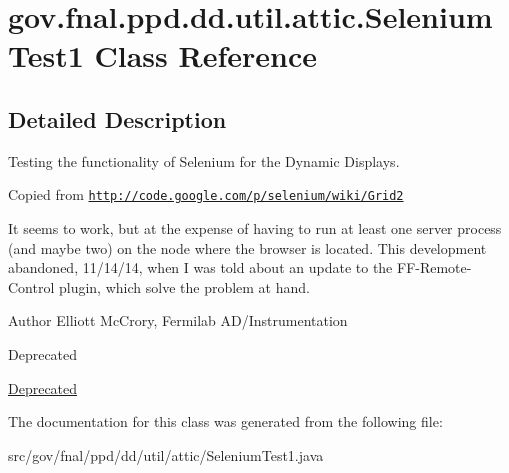 \hypertarget{classgov_1_1fnal_1_1ppd_1_1dd_1_1util_1_1attic_1_1SeleniumTest1}{\section{gov.\-fnal.\-ppd.\-dd.\-util.\-attic.\-Selenium\-Test1 Class Reference}
\label{classgov_1_1fnal_1_1ppd_1_1dd_1_1util_1_1attic_1_1SeleniumTest1}
}


\subsection{Detailed Description}
Testing the functionality of Selenium for the Dynamic Displays.

Copied from \href{http://code.google.com/p/selenium/wiki/Grid2}{\tt http\-://code.\-google.\-com/p/selenium/wiki/\-Grid2}

It seems to work, but at the expense of having to run at least one server process (and maybe two) on the node where the browser is located. This development abandoned, 11/14/14, when I was told about an update to the F\-F-\/\-Remote-\/\-Control plugin, which solve the problem at hand.

\begin{DoxyAuthor}{Author}
Elliott Mc\-Crory, Fermilab A\-D/\-Instrumentation 
\end{DoxyAuthor}
\begin{DoxyRefDesc}{Deprecated}
\item[\hyperlink{deprecated__deprecated000019}{Deprecated}]\end{DoxyRefDesc}


The documentation for this class was generated from the following file\-:\begin{DoxyCompactItemize}
\item 
src/gov/fnal/ppd/dd/util/attic/Selenium\-Test1.\-java\end{DoxyCompactItemize}
